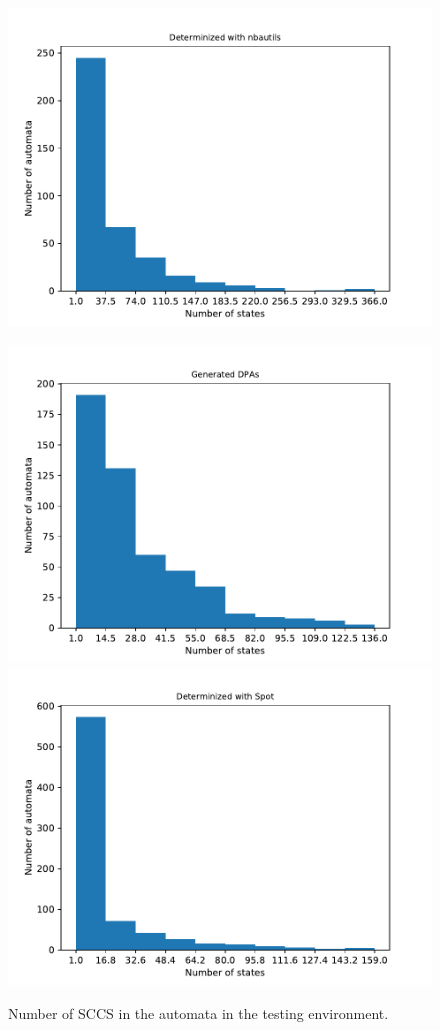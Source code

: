 \begin{figure}
\begin{minipage}{0.49\textwidth}
		\includegraphics[page=1,height=.3\textheight]{../data/analysis/rawstats_detnbaut.pdf}
		\caption{Number of SCCS in the automata in the testing environment.}
		\label{exp:fig:rawstats_sccs}
	\end{minipage}
	\hfill
	\begin{minipage}{0.49\textwidth}
		\includegraphics[page=2,height=.3\textheight]{../data/analysis/rawstats_gendet.pdf} 
		\includegraphics[page=2,height=.3\textheight]{../data/analysis/rawstats_detspot.pdf} 

\end{minipage}
\end{figure}
